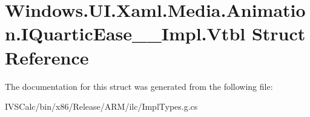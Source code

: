 \hypertarget{struct_windows_1_1_u_i_1_1_xaml_1_1_media_1_1_animation_1_1_i_quartic_ease_____impl_1_1_vtbl}{}\section{Windows.\+U\+I.\+Xaml.\+Media.\+Animation.\+I\+Quartic\+Ease\+\_\+\+\_\+\+Impl.\+Vtbl Struct Reference}
\label{struct_windows_1_1_u_i_1_1_xaml_1_1_media_1_1_animation_1_1_i_quartic_ease_____impl_1_1_vtbl}


The documentation for this struct was generated from the following file\+:\begin{DoxyCompactItemize}
\item 
I\+V\+S\+Calc/bin/x86/\+Release/\+A\+R\+M/ilc/Impl\+Types.\+g.\+cs\end{DoxyCompactItemize}
